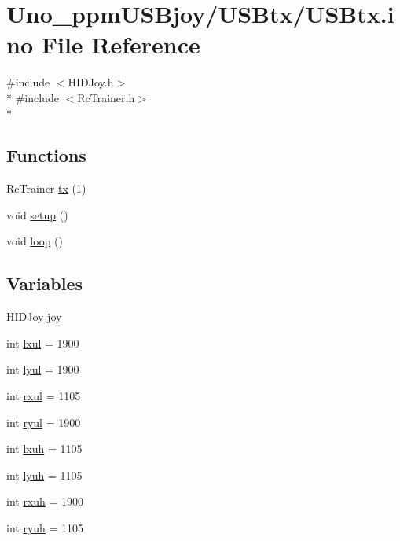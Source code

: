 \hypertarget{USBtx_8ino}{\section{Uno\-\_\-ppm\-U\-S\-Bjoy/\-U\-S\-Btx/\-U\-S\-Btx.ino File Reference}
\label{USBtx_8ino}
}
{\ttfamily \#include $<$H\-I\-D\-Joy.\-h$>$}\\*
{\ttfamily \#include $<$Rc\-Trainer.\-h$>$}\\*
\subsection*{Functions}
\begin{DoxyCompactItemize}
\item 
Rc\-Trainer \hyperlink{USBtx_8ino_a936a44d3f93ba7d2286b7bbb37a41ca8}{tx} (1)
\item 
void \hyperlink{USBtx_8ino_a4fc01d736fe50cf5b977f755b675f11d}{setup} ()
\item 
void \hyperlink{USBtx_8ino_afe461d27b9c48d5921c00d521181f12f}{loop} ()
\end{DoxyCompactItemize}
\subsection*{Variables}
\begin{DoxyCompactItemize}
\item 
H\-I\-D\-Joy \hyperlink{USBtx_8ino_a007be0d4a5f1eeab33bfa3d8cd1a63a3}{joy}
\item 
int \hyperlink{USBtx_8ino_aa6fec60ec2aa8c5a5bafed3a065a138d}{lxul} = 1900
\item 
int \hyperlink{USBtx_8ino_a55b62414fa89038f95180ac7a687aefa}{lyul} = 1900
\item 
int \hyperlink{USBtx_8ino_a8b39276be6e96eca17230ee5b3c79dca}{rxul} = 1105
\item 
int \hyperlink{USBtx_8ino_acf351f756f45d66d2050da5f1fc42b60}{ryul} = 1900
\item 
int \hyperlink{USBtx_8ino_a4292e7f32256a5c878f8a7947ca07e16}{lxuh} = 1105
\item 
int \hyperlink{USBtx_8ino_ac705af2d3b08651b36ecd15e80ba2922}{lyuh} = 1105
\item 
int \hyperlink{USBtx_8ino_abfea8543614f15a6f21030432e388719}{rxuh} = 1900
\item 
int \hyperlink{USBtx_8ino_ab2ce2b094b3a0c5b7e13c7bae3dc2c76}{ryuh} = 1105
\end{DoxyCompactItemize}


